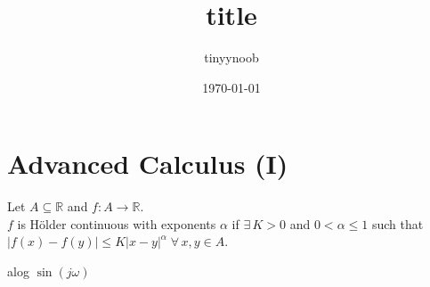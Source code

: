 \documentclass{article}
\title{title}
\author{tinyynoob}
\date{\today}
\begin{document}
\section*{Advanced Calculus (I)}
Let $A\subseteq \mathbb{R}$ and $f:A\to \mathbb{R}$. \\
$f$ is Hölder continuous with exponents $\alpha$ if 
$\exists\, K>0$ and $0<\alpha\leq 1$ such that 
$\left|f(x)-f(y)\right|\leq K\left|x-y\right|^\alpha \;\forall\,x,y\in A$.

alog $\sin(j\omega)$
\end{document}
